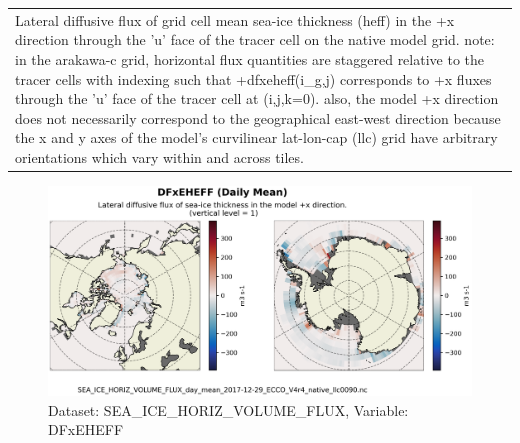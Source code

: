 \begin{longtable}{|m{}|m{}|m{}|m{}|}
\rowcolor{lightgray} \multicolumn{4}{|c|}{\textbf{Comments}} \\ \hline
\multicolumn{4}{|p{1\textwidth}|}{\footnotesize{{Lateral diffusive flux of grid cell mean sea-ice thickness (heff) in the +x direction through the 'u' face of the tracer cell on the native model grid. note: in the arakawa-c grid, horizontal flux quantities are staggered relative to the tracer cells with indexing such that +dfxeheff(i\_g,j) corresponds to +x fluxes through the 'u' face of the tracer cell at (i,j,k=0). also, the model +x direction does not necessarily correspond to the geographical east-west direction because the x and y axes of the model's curvilinear lat-lon-cap (llc) grid have arbitrary orientations which vary within and across tiles.}}} \\ \hline
\end{longtable}

\begin{figure}[H]
\centering
\includegraphics[scale=0.55]{../images/plots/native_plots/Sea-Ice_and_Snow_Horizontal_Volume_Fluxes/DFxEHEFF.png}
\caption{Dataset: SEA\_ICE\_HORIZ\_VOLUME\_FLUX, Variable: DFxEHEFF}
\label{tab:table-SEA_ICE_HORIZ_VOLUME_FLUX_DFxEHEFF-Plot}
\end{figure}
\newpage
\pagebreak
